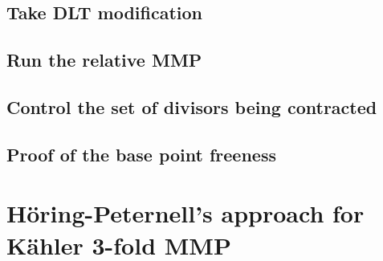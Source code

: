 \documentclass[11pt]{article}
\theoremstyle{definition}
\begin{document}
	\subsection{Take DLT modification}
	
	\subsection{Run the relative MMP}
	
	\subsection{Control the set of divisors being contracted}
	
	\subsection{Proof of the base point freeness}
	
	
	\section{H\"oring-Peternell's approach for K\"ahler 3-fold MMP}
	
	
	
	
	
	
\end{document}
